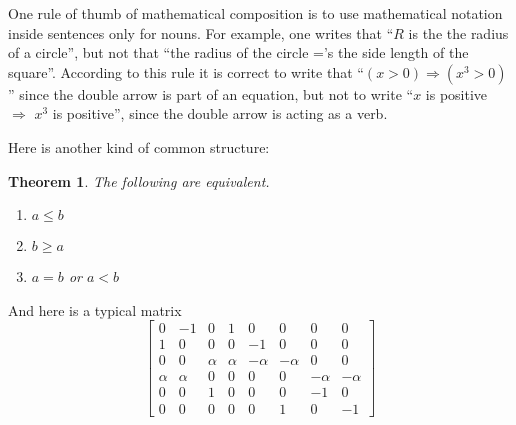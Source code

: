 \documentclass{article}
\newtheorem{theorem}{Theorem}
\begin{document}
   One rule of thumb of mathematical composition is to
   use mathematical notation inside sentences only for
   nouns.  For example, one writes that ``$R$ is the the
   radius of a circle'', but not that ``the radius of the
   circle ='s the side length of the square''.  According to
   this rule it is correct to write that
   ``$(x>0) \Rightarrow (x^{3} > 0)$'' since the double arrow is part of
   an equation, but not to write
   ``$x$ is positive $\Rightarrow$ $x^{3}$ is positive'', since the
   double arrow is acting as a verb.

Here is another kind of common structure:

\begin{theorem}
   The following are equivalent.
   \begin{enumerate}
      \item $a \leq b$
      \item $b \geq a$
      \item $a = b$ or $a<b$
   \end{enumerate}
\end{theorem}

And here is a typical matrix
 $$
 \left[
 \begin{array}{rrrrrrrr}
    0 & -1 & 0 & 1 & 0 & 0 & 0 & 0  \\
    1 & 0 & 0 & 0 & -1 & 0 & 0 & 0  \\
    0 & 0 & \alpha & \alpha & -\alpha & -\alpha & 0 & 0  \\
    \alpha & \alpha & 0 & 0 & 0 & 0 & -\alpha & -\alpha  \\
    0 & 0 & 1 & 0 & 0 & 0 & -1 & 0  \\
    0 & 0 & 0 & 0 & 0 & 1 & 0 & -1
 \end{array}
 \right]
 $$
\end{document}
